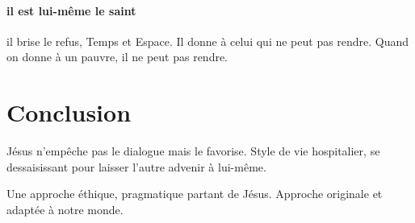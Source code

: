 \paragraph{il est lui-même le saint} il brise le refus, Temps et Espace. Il donne à celui qui ne peut pas rendre. Quand on donne à un pauvre, il ne peut pas rendre.


\section{Conclusion}


Jésus n'empêche pas le dialogue mais le favorise. 
Style de vie hospitalier, se dessaisissant pour laisser l'autre advenir à lui-même. 


\begin{Synthesis}
    Une approche éthique, pragmatique partant de Jésus. Approche originale et adaptée à notre monde.
\end{Synthesis}


 



 





 




 







